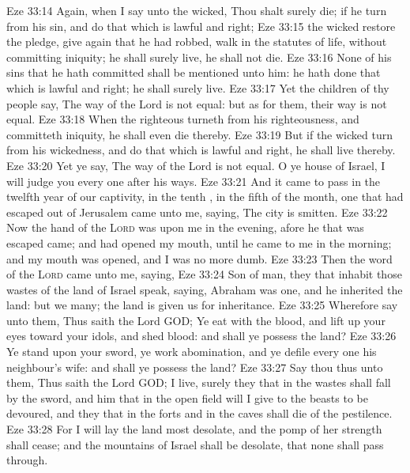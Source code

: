 \vs Eze 33:14 Again, when I say unto the wicked, Thou shalt surely die; if he turn from his sin, and do that which is lawful and right;
\vs Eze 33:15  the wicked restore the pledge, give again that he had robbed, walk in the statutes of life, without committing iniquity; he shall surely live, he shall not die.
\vs Eze 33:16 None of his sins that he hath committed shall be mentioned unto him: he hath done that which is lawful and right; he shall surely live.
\vs Eze 33:17 Yet the children of thy people say, The way of the Lord is not equal: but as for them, their way is not equal.
\vs Eze 33:18 When the righteous turneth from his righteousness, and committeth iniquity, he shall even die thereby.
\vs Eze 33:19 But if the wicked turn from his wickedness, and do that which is lawful and right, he shall live thereby.
\vs Eze 33:20 Yet ye say, The way of the Lord is not equal. O ye house of Israel, I will judge you every one after his ways.
\vs Eze 33:21 And it came to pass in the twelfth year of our captivity, in the tenth , in the fifth  of the month,  one that had escaped out of Jerusalem came unto me, saying, The city is smitten.
\vs Eze 33:22 Now the hand of the \textsc{Lord} was upon me in the evening, afore he that was escaped came; and had opened my mouth, until he came to me in the morning; and my mouth was opened, and I was no more dumb.
\vs Eze 33:23 Then the word of the \textsc{Lord} came unto me, saying,
\vs Eze 33:24 Son of man, they that inhabit those wastes of the land of Israel speak, saying, Abraham was one, and he inherited the land: but we  many; the land is given us for inheritance.
\vs Eze 33:25 Wherefore say unto them, Thus saith the Lord GOD; Ye eat with the blood, and lift up your eyes toward your idols, and shed blood: and shall ye possess the land?
\vs Eze 33:26 Ye stand upon your sword, ye work abomination, and ye defile every one his neighbour's wife: and shall ye possess the land?
\vs Eze 33:27 Say thou thus unto them, Thus saith the Lord GOD;  I live, surely they that  in the wastes shall fall by the sword, and him that  in the open field will I give to the beasts to be devoured, and they that  in the forts and in the caves shall die of the pestilence.
\vs Eze 33:28 For I will lay the land most desolate, and the pomp of her strength shall cease; and the mountains of Israel shall be desolate, that none shall pass through.
